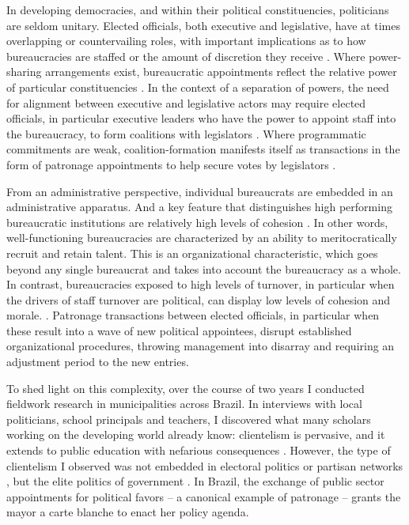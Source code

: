 \documentclass[12pt,a4paper]{article}
\begin{document}
In developing democracies, and within their political constituencies, politicians are seldom unitary. Elected officials, both executive and legislative, have at times overlapping or countervailing roles, with important implications as to how bureaucracies are staffed or the amount of discretion they receive \citep{huber_legislatures_2001,gailmard_formal_2012}. Where power-sharing arrangements exist, bureaucratic appointments reflect the relative power of particular constituencies \citep{francois_how_2015}. In the context of a separation of powers, the need for alignment between executive and legislative actors may require elected officials, in particular executive leaders who have the power to appoint staff into the bureaucracy, to form coalitions with legislators \citep{groseclose_1996_buying, banks_2000_buying, gottlieb_countervailing_2019}. Where programmatic commitments are weak, coalition-formation manifests itself as transactions in the form of patronage appointments to help secure votes by legislators \citep{power_optimism_2010, amorim_neto_presidential_2000}.

From an administrative perspective, individual bureaucrats are embedded in an administrative apparatus. And a key feature that distinguishes high performing bureaucratic institutions are relatively high levels of cohesion \citet{evans_embedded_1995,evans_bureaucracy_1999}. In other words, well-functioning bureaucracies are characterized by an ability to meritocratically recruit and retain talent. This is an organizational characteristic, which goes beyond any single bureaucrat and takes into account the bureaucracy as a whole. In contrast, bureaucracies exposed to high levels of turnover, in particular when the drivers of staff turnover are political, can display low levels of cohesion and morale. \citep{kohli_state-directed_2004, akhtari_political_2015}. Patronage transactions between elected officials, in particular when these result into a wave of new political appointees, disrupt established organizational procedures, throwing management into disarray and requiring an adjustment period to the new entries.

To shed light on this complexity, over the course of two years I conducted fieldwork research in municipalities across Brazil. In interviews with local politicians, school principals and teachers, I discovered what many scholars working on the developing world already know: clientelism is pervasive, and it extends to public education with nefarious consequences \citep{stokes_brokers_2013}. However, the type of clientelism I observed was not embedded in electoral politics \citep{oliveros_making_2016} or partisan networks \citep{akhtari_political_2015,colonnelli_patronage_2017}, but the elite politics of government \citep{raile_executive_2011}. In Brazil, the exchange of public sector appointments for political favors -- a canonical example of patronage -- grants the mayor a carte blanche to enact her policy agenda.
\end{document}
